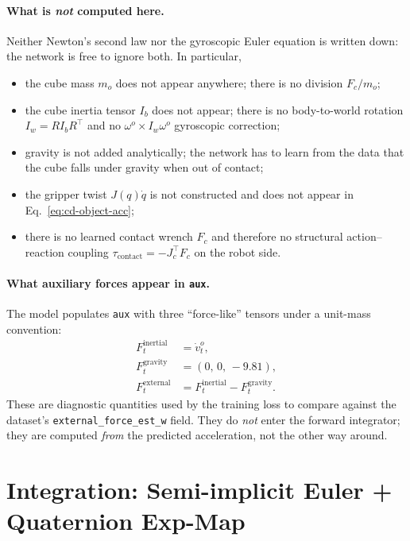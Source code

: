 \documentclass[11pt]{article}
\begin{document}
\paragraph{What is \emph{not} computed here.}
Neither Newton's second law nor the gyroscopic Euler equation is
written down: the network is free to ignore both.  In particular,
\begin{itemize}
  \item the cube mass $m_o$ does not appear anywhere; there is no
    division $F_c / m_o$;
  \item the cube inertia tensor $I_b$ does not appear; there is no
    body-to-world rotation $I_w = R I_b R^\top$ and no
    $\omega^o \times I_w \omega^o$ gyroscopic correction;
  \item gravity is not added analytically; the network has to learn
    from the data that the cube falls under gravity when out of
    contact;
  \item the gripper twist $J(q)\dot q$ is not constructed and does
    not appear in
    Eq.~\eqref{eq:cd-object-acc};
  \item there is no learned contact wrench $F_c$ and therefore no
    structural action--reaction coupling
    $\tau_{\mathrm{contact}} = -J_c^\top F_c$ on the robot side.
\end{itemize}

\paragraph{What auxiliary forces appear in \texttt{aux}.}
The model populates \texttt{aux} with three ``force-like'' tensors
under a unit-mass convention:
\begin{align}
  F^{\mathrm{inertial}}_t &= \dot v^o_t, \\
  F^{\mathrm{gravity}}_t &= (0,\,0,\,-9.81), \\
  F^{\mathrm{external}}_t &= F^{\mathrm{inertial}}_t - F^{\mathrm{gravity}}_t.
\end{align}
These are diagnostic quantities used by the training loss to compare
against the dataset's \texttt{external\_force\_est\_w} field.  They do
\emph{not} enter the forward integrator; they are computed
\emph{from} the predicted acceleration, not the other way around.

\section{Integration: Semi-implicit Euler + Quaternion Exp-Map}
\end{document}
